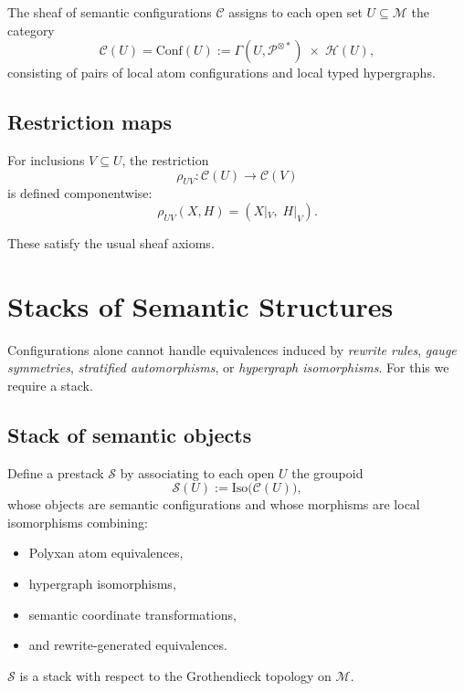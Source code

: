 \begin{definition}
The sheaf of semantic configurations $\mathscr{C}$ assigns to each open set
$U\subseteq\mathcal{M}$ the category
\[
\mathscr{C}(U)
=
\mathrm{Conf}(U)
:=
\Gamma(U,\mathscr{P}^{\otimes \ast})
\;\times\;
\mathscr{H}(U),
\]
consisting of pairs of local atom configurations and local typed hypergraphs.
\end{definition}

\subsection{Restriction maps}

For inclusions $V\subseteq U$, the restriction
\[
\rho_{UV}:\mathscr{C}(U)\to\mathscr{C}(V)
\]
is defined componentwise:
\[
\rho_{UV}(X,H) = (X|_V,\; H|_V).
\]

These satisfy the usual sheaf axioms.

\section{Stacks of Semantic Structures}

Configurations alone cannot handle equivalences induced by
\emph{rewrite rules}, \emph{gauge symmetries}, \emph{stratified
automorphisms}, or \emph{hypergraph isomorphisms}.  
For this we require a stack.

\subsection{Stack of semantic objects}

\begin{definition}
Define a prestack $\mathcal{S}$ by associating to each open $U$ the groupoid
\[
\mathcal{S}(U)
:= 
\mathrm{Iso}\bigl(\mathscr{C}(U)\bigr),
\]
whose objects are semantic configurations and whose morphisms are local
isomorphisms combining:
\begin{itemize}
  \item Polyxan atom equivalences,
  \item hypergraph isomorphisms,
  \item semantic coordinate transformations,
  \item and rewrite-generated equivalences.
\end{itemize}
\end{definition}

\begin{proposition}
$\mathcal{S}$ is a stack with respect to the Grothendieck topology on
$\mathcal{M}$.
\end{proposition}

